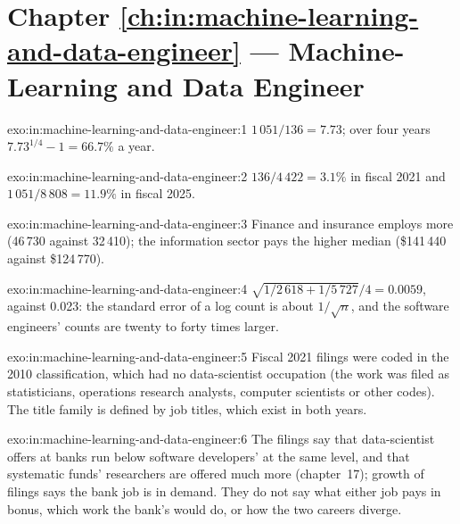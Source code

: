 \section*{Chapter \ref{ch:in:machine-learning-and-data-engineer} --- Machine-Learning and Data Engineer}

\begin{solution}{exo:in:machine-learning-and-data-engineer:1}
$1\,051/136=7.73$; over four years $7.73^{1/4}-1=66.7\%$ a year.
\end{solution}

\begin{solution}{exo:in:machine-learning-and-data-engineer:2}
$136/4\,422=3.1\%$ in fiscal 2021 and $1\,051/8\,808=11.9\%$ in fiscal 2025.
\end{solution}

\begin{solution}{exo:in:machine-learning-and-data-engineer:3}
Finance and insurance employs more (46\,730 against 32\,410); the information sector pays the higher median (\$141\,440
against \$124\,770).
\end{solution}

\begin{solution}{exo:in:machine-learning-and-data-engineer:4}
$\sqrt{1/2\,618+1/5\,727}/4=0.0059$, against 0.023: the standard error of a log count is about $1/\sqrt n$, and the
software engineers' counts are twenty to forty times larger.
\end{solution}

\begin{solution}{exo:in:machine-learning-and-data-engineer:5}
Fiscal 2021 filings were coded in the 2010 classification, which had no data-scientist occupation (the work was filed as
statisticians, operations research analysts, computer scientists or other codes). The title family is defined by job
titles, which exist in both years.
\end{solution}

\begin{solution}{exo:in:machine-learning-and-data-engineer:6}
The filings say that data-scientist offers at banks run below software developers' at the same level, and that
systematic funds' researchers are offered much more (chapter~17); growth of filings says the bank job is in demand. They
do not say what either job pays in bonus, which work the bank's  would do, or how the two careers diverge.
\end{solution}

